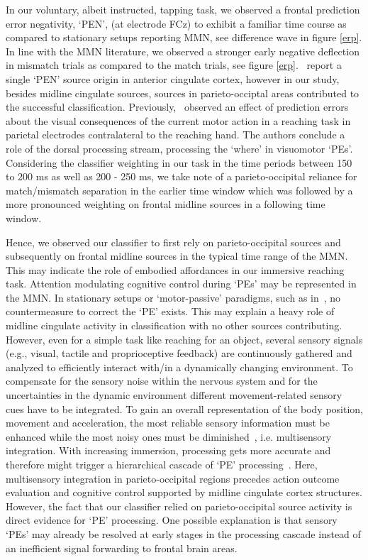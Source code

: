 In our voluntary, albeit instructed, tapping task, we observed a frontal prediction error negativity, `PEN', (at electrode FCz) to exhibit a familiar time course as compared to stationary setups reporting MMN, see difference wave in figure \ref{erp}. In line with the MMN literature, we observed a stronger early negative deflection in mismatch trials as compared to the match trials, see figure \ref{erp}.~\cite{Zander2016-ed} report a single `PEN' source origin in anterior cingulate cortex, however in our study, besides midline cingulate sources, sources in parieto-occiptal areas contributed to the successful classification. Previously,~\cite{Savoie2018-ad} observed an effect of prediction errors about the visual consequences of the current motor action in a reaching task in parietal electrodes contralateral to the reaching hand. The authors conclude a role of the dorsal processing stream, processing the `where' in visuomotor `PEs'. Considering the classifier weighting in our task in the time periods between 150 to 200 ms as well as 200 - 250 ms, we take note of a parieto-occipital reliance for match/mismatch separation in the earlier time window which was followed by a more pronounced weighting on frontal midline sources in a following time window.

Hence, we observed our classifier to first rely on parieto-occipital sources and subsequently on frontal midline sources in the typical time range of the MMN. This may indicate the role of embodied affordances in our immersive reaching task. Attention modulating cognitive control during `PEs' may be represented in the MMN. In stationary setups or `motor-passive' paradigms, such as in~\cite{Zander2016-ed}, no countermeasure to correct the `PE' exists. This may explain a heavy role of midline cingulate activity in classification with no other sources contributing. However, even for a simple task like reaching for an object, several sensory signals (e.g., visual, tactile and proprioceptive feedback) are continuously gathered and analyzed to efficiently interact with/in a dynamically changing environment. To compensate for the sensory noise within the nervous system and for the uncertainties in the dynamic environment different movement-related sensory cues have to be integrated. To gain an overall representation of the body position, movement and acceleration, the most reliable sensory information must be enhanced while the most noisy ones must be diminished~\cite{Fetsch2011-bp}, i.e. multisensory integration. With increasing immersion, processing gets more accurate and therefore might trigger a hierarchical cascade of `PE' processing~\cite{Singh2021-qc}. Here, multisensory integration in parieto-occipital regions precedes action outcome evaluation and cognitive control supported by midline cingulate cortex structures. However, the fact that our classifier relied on parieto-occipital source activity is direct evidence for `PE' processing. One possible explanation is that sensory `PEs' may already be resolved at early stages in the processing cascade instead of an inefficient signal forwarding to frontal brain areas.

